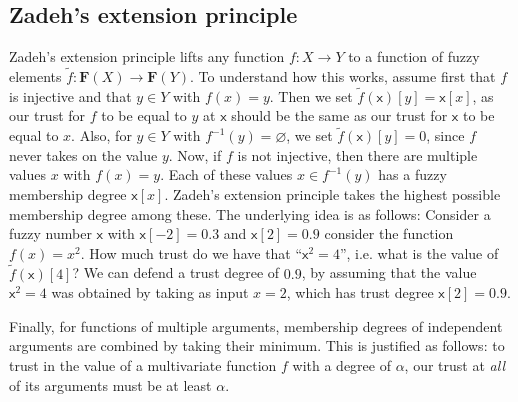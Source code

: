 \documentclass[runningheads]{llncs}
\renewcommand{\emptyset}{\varnothing}
\renewcommand{\emph}[1]{{\it #1}}
\begin{document}



\subsection{Zadeh's extension principle}


Zadeh's extension principle \cite{Jezewski2017theory,zadeh1965fuzzy} lifts any function $f:X\to Y$ to a function of fuzzy elements 
$\widetilde{f}\colon \mathbf{F}(X)\rightarrow \mathbf{F}(Y)$.
To understand how this works, assume first that $f$ is injective and that $y\in Y$ with $f(x)=y$. 
Then we set $\widetilde{f}(\mathsf{x})[y]= \mathsf{x}[x]$, as our trust for $f$ to be equal to $y$ at $\mathsf{x}$ should be the same as our trust for $\mathsf{x}$ to be equal to $x$. 
Also, for $y\in Y$ with $f^{-1}(y) = \emptyset$, we set $\widetilde{f}(\mathsf{x})[y]=0$, since $f$ never takes on the value $y$.
Now, if $f$ is not injective, then there are multiple values $x$ with $f(x)=y$. Each of these values $x\in f^{-1}(y)$ has a fuzzy membership degree $\mathsf{x}[x]$. Zadeh's extension principle takes the highest possible membership degree among these. The underlying idea is as follows: 
Consider a fuzzy number $\mathsf{x}$ with
$\mathsf{x}[-2]= 0.3$ and 
$\mathsf{x}[2]= 0.9$
consider the function $f(x)= x^2$. 
How much trust do we have that ``$\mathsf{x}^2=4$'', i.e.  what is the value of $\widetilde f(\mathsf{x})[4]$? 
We can defend a trust degree of $0.9$, by assuming that the value $\mathsf{x}^2=4$ was obtained by taking as input $x=2$, which has trust degree $\mathsf{x}[2]= 0.9$.


Finally, for functions of multiple arguments, membership degrees of independent arguments are combined by taking their minimum.
This is justified as follows: to trust in the value of a multivariate function $f$ with a degree of $\alpha$, our trust at \emph{all} of its arguments must be at least $\alpha$.
 
\end{document}

